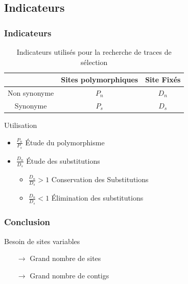 \subsection{Indicateurs}
\begin{frame}
    \frametitle{Indicateurs}
    
    \begin{table}
        \centering
        \small
        \begin{tabular}{c c c}
           
            \toprule
              & Sites polymorphiques  & Site Fixés\\
            \midrule
            Non synonyme& $P_n$ & $D_n$  \\
            Synonyme & $P_s$ & $D_s$  \\

            \bottomrule
           
        \end{tabular}
         \caption{Indicateurs utilisés pour la recherche de traces de sélection}
    \end{table}

    \begin{exampleblock}{Utilisation}
        \begin{itemize}
            \item  $\frac{P_n}{P_s}$ Étude du polymorphisme 
            \item  $\frac{D_n}{D_s}$ Étude des substitutions
            \begin{itemize}
                \item $\frac{D_n}{D_s} > 1$ Conservation des Substitutions
                \item $\frac{D_n}{D_s} < 1$ Élimination des substitutions
            \end{itemize}

        \end{itemize}
    \end{exampleblock}

    
\end{frame}

\begin{frame}
    \frametitle{Conclusion}
     \begin{alertblock}{Besoin de sites variables}
        \begin{itemize}
            \item[$\rightarrow$] Grand nombre de sites
            \item[$\rightarrow$] Grand nombre de contigs
        \end{itemize}
    \end{alertblock}
    
\end{frame}

